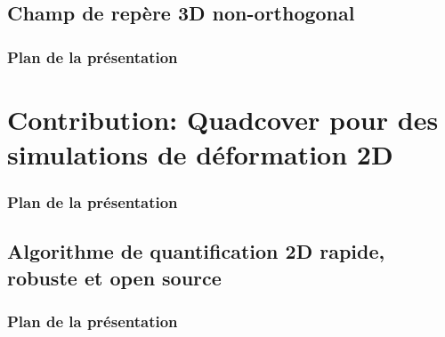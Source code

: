 \documentclass{beamer}
\begin{document}
\subsection{Champ de repère 3D non-orthogonal}
\begin{frame}
    \frametitle{Plan de la présentation}
    \tableofcontents[currentsubsection, sectionstyle=show/shaded, subsectionstyle=show/shaded/hide]
\end{frame}


%


%

\section{Contribution: Quadcover pour des simulations de déformation 2D}
\begin{frame}
    \frametitle{Plan de la présentation}
    \tableofcontents[currentsection, sectionstyle=show/shaded, subsectionstyle=show/show/hide]
\end{frame}
\subsection{Algorithme de quantification 2D rapide, robuste et open source}
\begin{frame}
    \frametitle{Plan de la présentation}
    \tableofcontents[currentsubsection, sectionstyle=show/shaded, subsectionstyle=show/shaded/hide]
\end{frame}

\end{document}
